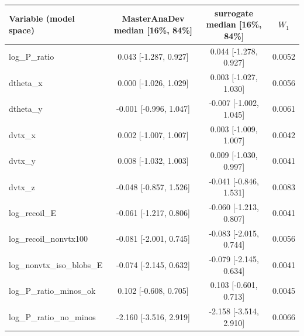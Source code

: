 \begin{tabular}{lccc}
\toprule
Variable (model space) & MasterAnaDev median [16\%, 84\%] & surrogate median [16\%, 84\%] & $W_1$ \\
\midrule
log\_P\_ratio & 0.043 [-1.287, 0.927] & 0.044 [-1.278, 0.927] & 0.0052 \\
dtheta\_x & 0.000 [-1.026, 1.029] & 0.003 [-1.027, 1.030] & 0.0056 \\
dtheta\_y & -0.001 [-0.996, 1.047] & -0.007 [-1.002, 1.045] & 0.0061 \\
dvtx\_x & 0.002 [-1.007, 1.007] & 0.003 [-1.009, 1.007] & 0.0042 \\
dvtx\_y & 0.008 [-1.032, 1.003] & 0.009 [-1.030, 0.997] & 0.0041 \\
dvtx\_z & -0.048 [-0.857, 1.526] & -0.041 [-0.846, 1.531] & 0.0083 \\
log\_recoil\_E & -0.061 [-1.217, 0.806] & -0.060 [-1.213, 0.807] & 0.0041 \\
log\_recoil\_nonvtx100 & -0.081 [-2.001, 0.745] & -0.083 [-2.015, 0.744] & 0.0056 \\
log\_nonvtx\_iso\_blobs\_E & -0.074 [-2.145, 0.632] & -0.079 [-2.145, 0.634] & 0.0041 \\
log\_P\_ratio\_minos\_ok & 0.102 [-0.608, 0.705] & 0.103 [-0.601, 0.713] & 0.0045 \\
log\_P\_ratio\_no\_minos & -2.160 [-3.516, 2.919] & -2.158 [-3.514, 2.910] & 0.0066 \\
\bottomrule
\end{tabular}
